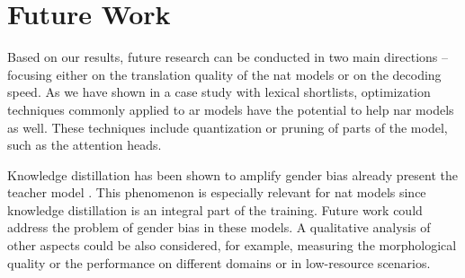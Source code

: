 
\section*{Future Work}
Based on our results, future research can be conducted in two main directions
-- focusing either on the translation quality of the \ac{nat} models or on the
decoding speed. As we have shown in a case study with lexical shortlists,
optimization techniques commonly applied to \ac{ar} models have the potential
to help \ac{nar} models as well. These techniques include quantization or
pruning of parts of the model, such as the attention heads.

Knowledge distillation has been shown to amplify gender bias already present
the teacher model \citep{vamvas-sennrich-2021-contrastive}. This phenomenon is
especially relevant for \acs{nat} models since knowledge distillation is an
integral part of the training. Future work could address the problem of gender
bias in these models. A qualitative analysis of other aspects could be also
considered, for example, measuring the morphological quality or the performance
on different domains or in low-resource scenarios.


